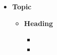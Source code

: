 \begin{itemize}

	\item \textbf{Topic}

	      \begin{itemize}[label=]

		      \item \textbf{Heading}

		            \begin{itemize}[label=]
			            \item \lipsum[1-1]
			            \item \lipsum[2-2]
		            \end{itemize}

	      \end{itemize}

\end{itemize}
